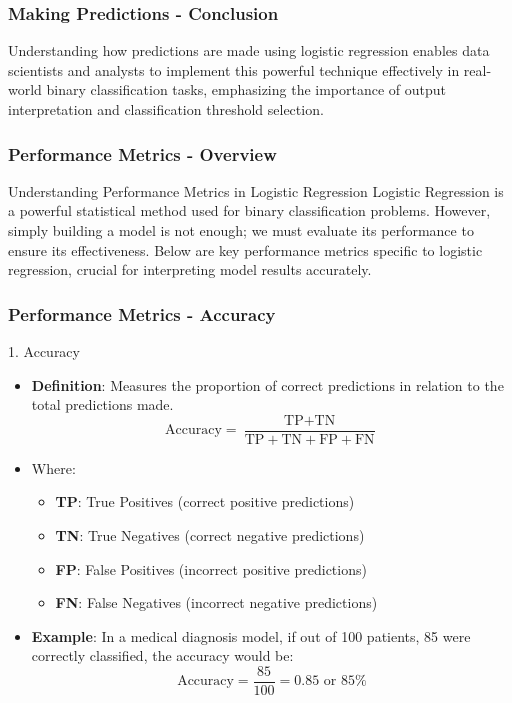 \documentclass[aspectratio=169]{beamer}
\begin{document}
\begin{frame}[fragile]
  \frametitle{Making Predictions - Conclusion}
  
  Understanding how predictions are made using logistic regression enables data scientists and analysts to implement this powerful technique effectively in real-world binary classification tasks, emphasizing the importance of output interpretation and classification threshold selection.

\end{frame}

\begin{frame}[fragile]
    \frametitle{Performance Metrics - Overview}
    \begin{block}{Understanding Performance Metrics in Logistic Regression}
        Logistic Regression is a powerful statistical method used for binary classification problems. However, simply building a model is not enough; we must evaluate its performance to ensure its effectiveness. 
        Below are key performance metrics specific to logistic regression, crucial for interpreting model results accurately.
    \end{block}
\end{frame}

\begin{frame}[fragile]
    \frametitle{Performance Metrics - Accuracy}
    \begin{block}{1. Accuracy}
        \begin{itemize}
            \item \textbf{Definition}: Measures the proportion of correct predictions in relation to the total predictions made.
            \begin{equation}
                \text{Accuracy} = \frac{\text{TP} + \text{TN}}{\text{TP} + \text{TN} + \text{FP} + \text{FN}}
            \end{equation}
            \item Where:
            \begin{itemize}
                \item \textbf{TP}: True Positives (correct positive predictions)
                \item \textbf{TN}: True Negatives (correct negative predictions)
                \item \textbf{FP}: False Positives (incorrect positive predictions)
                \item \textbf{FN}: False Negatives (incorrect negative predictions)
            \end{itemize}
            \item \textbf{Example}: In a medical diagnosis model, if out of 100 patients, 85 were correctly classified, the accuracy would be:
            \begin{equation}
                \text{Accuracy} = \frac{85}{100} = 0.85 \text{ or } 85\%
            \end{equation}
        \end{itemize}
    \end{block}
\end{frame}
\end{document}
